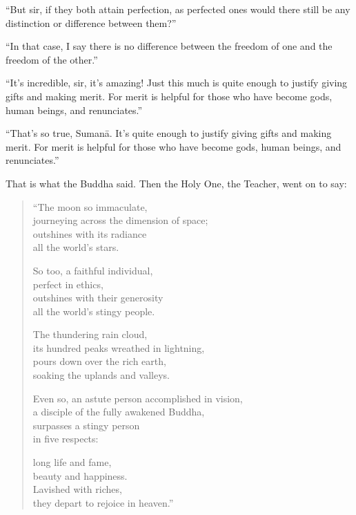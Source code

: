 \documentclass[12pt,openany]{book}%
\begin{document}
“But sir, if they both attain perfection, as perfected ones would there still be any distinction or difference between them?” 

“In that case, I say there is no difference between the freedom of one and the freedom of the other.” 

“It’s incredible, sir, it’s amazing! Just this much is quite enough to justify giving gifts and making merit. For merit is helpful for those who have become gods, human beings, and renunciates.” 

“That’s so true, \textsanskrit{Sumanā}. It’s quite enough to justify giving gifts and making merit. For merit is helpful for those who have become gods, human beings, and renunciates.” 

That is what the Buddha said. Then the Holy One, the Teacher, went on to say: 

\begin{verse}%
“The moon so immaculate, \\
journeying across the dimension of space; \\
outshines with its radiance \\
all the world’s stars. 

So too, a faithful individual, \\
perfect in ethics, \\
outshines with their generosity \\
all the world’s stingy people. 

The thundering rain cloud, \\
its hundred peaks wreathed in lightning, \\
pours down over the rich earth, \\
soaking the uplands and valleys. 

Even so, an astute person accomplished in vision, \\
a disciple of the fully awakened Buddha, \\
surpasses a stingy person \\
in five respects: 

long life and fame, \\
beauty and happiness. \\
Lavished with riches, \\
they depart to rejoice in heaven.” 

%
\end{verse}
\end{document}
